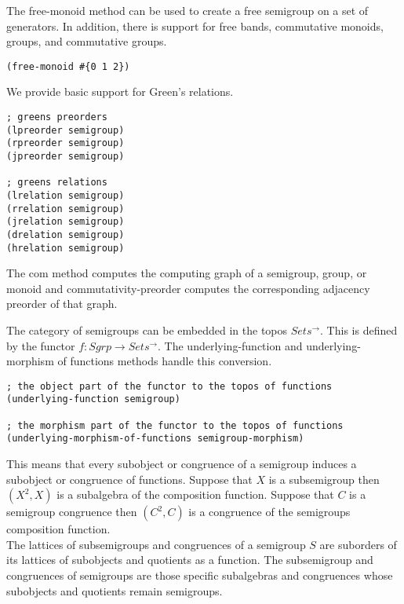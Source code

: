 \documentclass[a4paper,11pt]{report}
\begin{document}
The free-monoid method can be used to create a free semigroup on a set of generators. In addition, there is support for free bands, commutative monoids, groups, and commutative groups.

\lstset {language=Lisp}
\begin{lstlisting}
(free-monoid #{0 1 2})
\end{lstlisting}

We provide basic support for Green's relations. 

\lstset {language=Lisp}
\begin{lstlisting}
; greens preorders
(lpreorder semigroup)
(rpreorder semigroup)
(jpreorder semigroup)

; greens relations
(lrelation semigroup)
(rrelation semigroup)
(jrelation semigroup)
(drelation semigroup)
(hrelation semigroup)
\end{lstlisting}

The com method computes the computing graph of a semigroup, group, or monoid and commutativity-preorder computes the corresponding adjacency preorder of that graph. 

\newpage 

The category of semigroups can be embedded in the topos $Sets^{\to}$. This is defined by the functor $f: Sgrp \to Sets^{\to}$. The underlying-function and underlying-morphism of functions methods handle this conversion.

\lstset {language=Lisp}
\begin{lstlisting}
; the object part of the functor to the topos of functions
(underlying-function semigroup)

; the morphism part of the functor to the topos of functions
(underlying-morphism-of-functions semigroup-morphism)
\end{lstlisting}

This means that every subobject or congruence of a semigroup induces a subobject or congruence of functions. Suppose that $X$ is a subsemigroup then $(X^2,X)$ is a subalgebra of the composition function. Suppose that $C$ is a semigroup congruence then $(C^2,C)$ is a congruence of the semigroups composition function. \\

The lattices of subsemigroups and congruences of a semigroup $S$ are suborders of its lattices of subobjects and quotients as a function. The subsemigroup and congruences of semigroups are those specific subalgebras and congruences whose subobjects and quotients remain semigroups. \\ 
\end{document}
